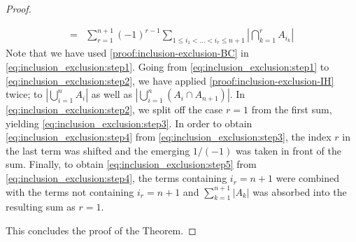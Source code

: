 \begin{proof}
\begin{enumerate}[partopsep=0em, topsep=0em, label=(\roman*)]
\begin{align}
= & \sum_{r=1}^{n+1} (-1)^{r-1} \sum_{1\le i_1<\dots<i_r\le n+1} \left|\bigcap_{k=1}^r A_{i_k}\right| \label{eq:inclusion_exclusion:step5} 
\end{align}
Note that we have used \ref{proof:inclusion-exclusion-BC} in \eqref{eq:inclusion_exclusion:step1}.
Going from \eqref{eq:inclusion_exclusion:step1} to \eqref{eq:inclusion_exclusion:step2}, we have applied \ref{proof:inclusion-exclusion-IH} twice; to \(\left|\bigcup_{i=1}^n A_i\right|\) as well as \(\left|\bigcup_{i=1}^n\left(A_i \cap A_{n+1}\right)\right|\).
In \eqref{eq:inclusion_exclusion:step2}, we split off the case \(r=1\) from the first sum, yielding \eqref{eq:inclusion_exclusion:step3}.
In order to obtain \eqref{eq:inclusion_exclusion:step4} from \eqref{eq:inclusion_exclusion:step3}, the index $r$ in the last term was shifted and the emerging $1/(-1)$ was taken in front of the sum.
Finally, to obtain \eqref{eq:inclusion_exclusion:step5} from \eqref{eq:inclusion_exclusion:step4}, the terms containing $i_r=n+1$ were combined with the terms not containing $i_r=n+1$ and $\sum_{k=1}^{n+1}\left|A_k\right|$ was absorbed into the resulting sum as $r=1$.
\textcolor{Green}{}
\end{enumerate}
\nopagebreak
This concludes the proof of the  Theorem.
\end{proof}




